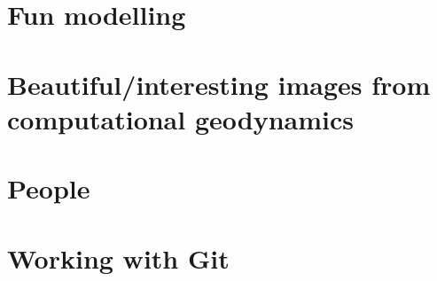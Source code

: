 \documentclass[a4paper]{article}
\begin{document}
\section{Fun modelling}  %
\newpage %
\section{Beautiful/interesting images from computational geodynamics}%
\newpage %
\section{People}%
\newpage %
\section{Working with Git} %




\newpage %
{\small } %
\newpage %

\newpage %
\listoftodos[Notes] %
\end{document}

